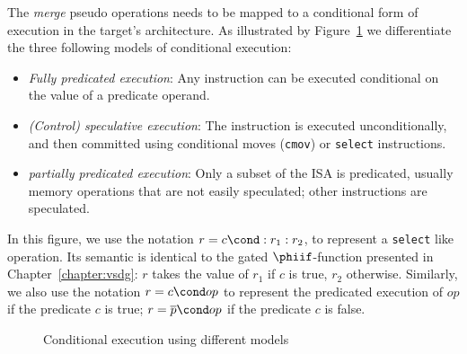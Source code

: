 The \textit{merge} pseudo operations needs to be mapped to a conditional form of execution in the target's architecture. As illustrated by Figure~\ref{fig:pred} we differentiate the three following models of conditional execution:
\begin{itemize}
\item \emph{Fully predicated execution}: Any instruction can be executed conditional on the value of a predicate operand.
\item \emph{(Control) speculative execution}: The instruction is executed unconditionally, and then committed using conditional moves (\texttt{cmov}) or \texttt{select} instructions. 
\item \emph{partially predicated execution}: Only a subset of the ISA is predicated, usually memory operations that are not easily speculated; other instructions are speculated.
\end{itemize}
In this figure, we use the notation $r = c \cond :r_1:r_2$, to represent a \texttt{select} like operation. Its semantic is identical to the gated $\phiif$-function presented in Chapter~\ref{chapter:vsdg}: $r$ takes the value of $r_1$ if $c$ is true, $r_2$ otherwise. Similarly, we also use the notation $r = c \cond op$ to represent the predicated execution of $op$ if the predicate $c$ is true; $r = \overline{p} \cond op$ if the predicate $c$ is false.

\begin{figure}[h]
\footnotesize
{}
\hfill
{} \hfill
{}
\caption{Conditional execution using different models}
\label{fig:pred}
\end{figure}

